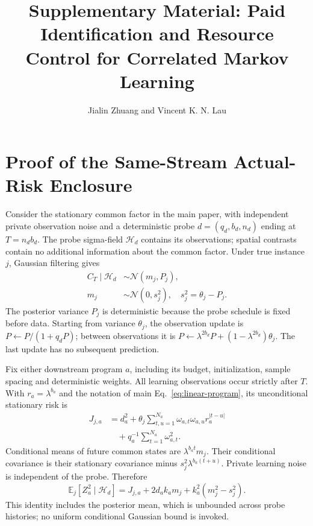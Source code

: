 \documentclass[journal]{IEEEtran}
\title{Supplementary Material: Paid Identification and Resource Control for Correlated Markov Learning}
\author{Jialin Zhuang and Vincent K. N. Lau}
\newcommand{\E}{\mathbb E}
\begin{document}
\maketitle
\renewcommand{\theequation}{S\arabic{equation}}

\section{Proof of the Same-Stream Actual-Risk Enclosure}
Consider the stationary common factor in the main paper, with independent private observation noise and a deterministic probe $d=(q_d,b_d,n_d)$ ending at $T=n_db_d$.
The probe sigma-field $\mathcal H_d$ contains its observations; spatial contrasts contain no additional information about the common factor.
Under true instance $j$, Gaussian filtering gives
\begin{align}
C_T\mid\mathcal H_d&\sim\mathcal N(m_j,P_j),\nonumber\\
m_j&\sim\mathcal N(0,s_j^2),\quad s_j^2=\theta_j-P_j.
\end{align}
The posterior variance $P_j$ is deterministic because the probe schedule is fixed before data.
Starting from variance $\theta_j$, the observation update is $P\leftarrow P/(1+q_dP)$; between observations it is $P\leftarrow\lambda^{2b_d}P+(1-\lambda^{2b_d})\theta_j$.
The last update has no subsequent prediction.

Fix either downstream program $a$, including its budget, initialization, sample spacing and deterministic weights.
All learning observations occur strictly after $T$.
With $r_a=\lambda^{b_a}$ and the notation of main Eq.~\eqref{eq:linear-program}, its unconditional stationary risk is
\begin{align}
J_{j,a}
&=d_a^2+\theta_j\sum_{t,u=1}^{N_a}\omega_{a,t}\omega_{a,u}r_a^{|t-u|}\nonumber\\
&\quad+q_a^{-1}\sum_{t=1}^{N_a}\omega_{a,t}^2.
\label{eq:supp-exact-risk}
\end{align}
Conditional means of future common states are $\lambda^{b_at}m_j$.
Their conditional covariance is their stationary covariance minus $s_j^2\lambda^{b_a(t+u)}$.
Private learning noise is independent of the probe.
Therefore
\begin{equation}
\E_j[Z_a^2\mid\mathcal H_d]
=J_{j,a}+2d_ak_am_j+k_a^2(m_j^2-s_j^2).
\label{eq:supp-conditional-risk}
\end{equation}
This identity includes the posterior mean, which is unbounded across probe histories; no uniform conditional Gaussian bound is invoked.
\end{document}
